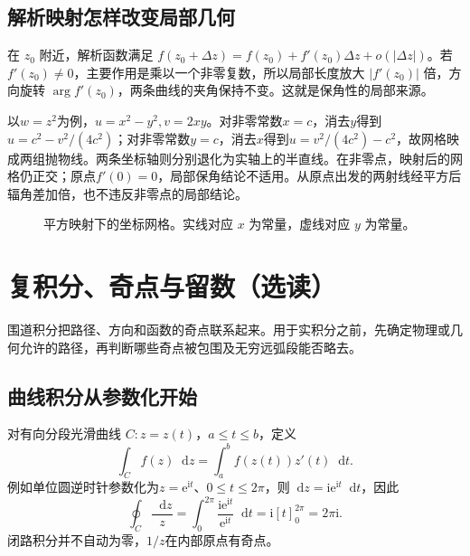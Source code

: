 \documentclass[11pt,openany,fontset=fandol]{ctexbook}
\theoremstyle{plain}\newtheorem{theorem}{定理}[chapter]\newtheorem{proposition}[theorem]{命题}
\theoremstyle{definition}\newtheorem{definition}{定义}[chapter]\newtheorem{example}{例}[chapter]
\theoremstyle{remark}\newtheorem*{remark}{说明}
\newcommand{\dd}{\mathop{}\!\mathrm d}\newcommand{\ii}{\mathrm i}\newcommand{\ee}{\mathrm e}
\begin{document}
\subsection{解析映射怎样改变局部几何}
在 $z_0$ 附近，解析函数满足 $f(z_0+\Delta z)=f(z_0)+f'(z_0)\Delta z+o(|\Delta z|)$。若 $f'(z_0)\ne0$，主要作用是乘以一个非零复数，所以局部长度放大 $|f'(z_0)|$ 倍，方向旋转 $\arg f'(z_0)$，两条曲线的夹角保持不变。这就是保角性的局部来源。

以$w=z^2$为例，$u=x^2-y^2,v=2xy$。对非零常数$x=c$，消去$y$得到$u=c^2-v^2/(4c^2)$；对非零常数$y=c$，消去$x$得到$u=v^2/(4c^2)-c^2$，故网格映成两组抛物线。两条坐标轴则分别退化为实轴上的半直线。在非零点，映射后的网格仍正交；原点$f'(0)=0$，局部保角结论不适用。从原点出发的两射线经平方后辐角差加倍，也不违反非零点的局部结论。
\begin{figure}[htbp]\centering
{}
\caption{平方映射下的坐标网格。实线对应 $x$ 为常量，虚线对应 $y$ 为常量。}
\label{fig:orig-013}
\end{figure}

\section{复积分、奇点与留数（选读）}
围道积分把路径、方向和函数的奇点联系起来。用于实积分之前，先确定物理或几何允许的路径，再判断哪些奇点被包围及无穷远弧段能否略去。

\subsection{曲线积分从参数化开始}
对有向分段光滑曲线 $C:z=z(t)$，$a\le t\le b$，定义
\begin{equation}
\int_C f(z)\dd z=\int_a^b f(z(t))z'(t)\dd t.
\end{equation}
例如单位圆逆时针参数化为$z=\ee^{\ii t}$、$0\le t\le2\pi$，则$\dd z=\ii\ee^{\ii t}\dd t$，因此
\[\oint_C\frac{\dd z}{z}
=\int_0^{2\pi}\frac{\ii\ee^{\ii t}}{\ee^{\ii t}}\dd t
=\ii[t]_0^{2\pi}=2\pi\ii.\]
闭路积分并不自动为零，$1/z$在内部原点有奇点。
\end{document}
